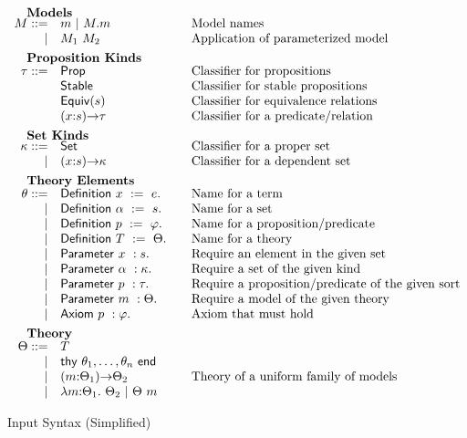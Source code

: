 \begin{figure}
\[\begin{array}{rl@{\qquad}l}
		\noalign{\textbf{Models}}		
		\im ::= 
		    & \iM \ |\ \iselect{\im}{\iM}&\mbox{Model names}\\
		  | & \iapp{\im_1}{\im_2}&\mbox{Application of parameterized model}\\[5pt]
		
		\noalign{\textbf{Proposition Kinds}}
		\ipt ::=
		    & \iProp & \mbox{Classifier for propositions}\\
		    & \iStable & \mbox{Classifier for stable propositions}\\
		    & \iEquiv{\is} &\mbox{Classifier for equivalence relations}\\
		    & \idarrow{\ix}{\is}{\ipt} & \mbox{Classifier for a predicate/relation}\\[5pt] 
		
		\noalign{\textbf{Set Kinds}}
		\ik ::= 
		    & \iSet &\mbox{Classifier for a proper set}\\
		   | & \idarrow{\ix}{\is}{\ik} &\mbox{Classifier for a dependent set}\\[5pt]
		

		\noalign{\textbf{Theory Elements}}
		\ite ::=
		     & \iDefinition{\ix}{\ie}&\mbox{Name for a term}\\
		   | & \iDefinition{\iS}{\is}&\mbox{Name for a set}\\
		   | & \iDefinition{\iP}{\ip}&\mbox{Name for a proposition/predicate}\\
		   | & \iDefinition{\iTH}{\ith}&\mbox{Name for a theory}\\
		   | & \iParameter{\ix}{\is}&\mbox{Require an element in the given set}\\
		   | & \iParameter{\iS}{\ik}&\mbox{Require a set of the given kind}\\
		   | & \iParameter{\iP}{\ipt}&\mbox{Require a proposition/predicate of the given sort}\\
		   | & \iParameter{\iM}{\ith}&\mbox{Require a model of the given theory}\\
		   | & \iAxiom{\iP}{\ip}&\mbox{Axiom that must hold}\\[5pt]

  		\noalign{\textbf{Theory}}
		\ith ::= 
		     & \iTH\\
		   	| & \ithy{\ite_1,\ldots,\ite_n}\\
		 	| & \idarrow{\iM}{\ith_1}{\ith_2} &\mbox{Theory of a uniform family of models}\\
		  	| & \ilambda{\iM}{\ith_1}{\ith_2}\ |\ 
		      \iapp{\ith}{\iM}\\
	\end{array}
	\]
	\label{fig:input}
	\caption{Input Syntax (Simplified)}
\end{figure}



